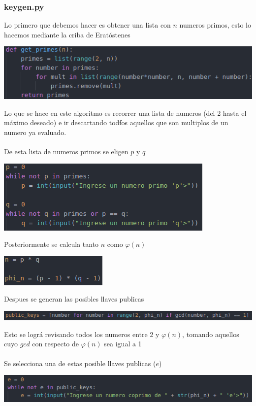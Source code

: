 \documentclass{article}
\begin{document}
  \subsubsection{keygen.py}
  Lo primero que debemos hacer es obtener una lista con $n$ numeros primos, esto lo hacemos mediante la criba de Eratóstenes\\
  \begin{center}
    \includegraphics{img/get_primes.png}
  \end{center}
  Lo que se hace en este algoritmo es recorrer una lista de numeros (del 2 hasta el máximo deseado) e ir descartando todfos aquellos que son multiplos de un numero ya evaluado.\\
  \\
  De esta lista de numeros primos se eligen $p$ y $q$\\
  \begin{center}
    \includegraphics{img/get_p_q.png}
  \end{center}

  Posteriormente se calcula tanto $n$ como $\varphi(n)$\\
  \begin{center}
    \includegraphics{img/calculate_n_phin.png}
  \end{center}

  Despues se generan las posibles llaves publicas
  \begin{center}
    \includegraphics{img/public_keys.png}
  \end{center}
  Esto se lográ revisando todos los numeros entre 2 y $\varphi(n)$, tomando aquellos cuyo $gcd$ con respecto de $\varphi(n)$ sea igual a 1\\
  \\
  Se selecciona una de estas posible llaves publicas ($e$)
  \begin{center}
    \includegraphics{img/get_e.png}
  \end{center}
\end{document}
